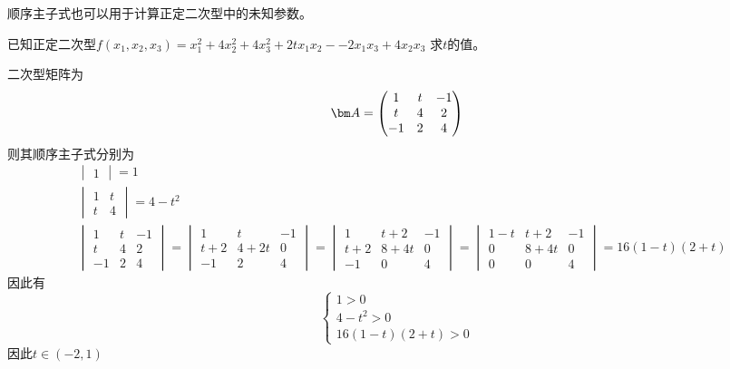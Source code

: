 顺序主子式也可以用于计算正定二次型中的未知参数。
\begin{example}
    已知正定二次型$f(x_1,x_2,x_3)=x_1^2 + 4x_2^2 + 4x_3^2 + 2tx_1x_2 - -2x_1x_3 + 4x_2x_3$
    求$t$的值。
\end{example}
\begin{solution}
    二次型矩阵为
    \[
        \mat{A} =
        \begin{pmatrix}
            1  & t & -1 \\
            t  & 4 & 2  \\
            -1 & 2 & 4
        \end{pmatrix}
    \]
    则其顺序主子式分别为
    \begin{align*}
         &
        \begin{vmatrix}
            1
        \end{vmatrix}  = 1    \\
         &
        \begin{vmatrix}
            1 & t \\
            t & 4
        \end{vmatrix} = 4-t^2 \\
         &
        \begin{vmatrix}
            1  & t & -1 \\
            t  & 4 & 2  \\
            -1 & 2 & 4
        \end{vmatrix} =
        \begin{vmatrix}
            1   & t    & -1 \\
            t+2 & 4+2t & 0  \\
            -1  & 2    & 4
        \end{vmatrix}
        =
        \begin{vmatrix}
            1   & t+2  & -1 \\
            t+2 & 8+4t & 0  \\
            -1  & 0    & 4
        \end{vmatrix}
        =
        \begin{vmatrix}
            1-t & t+2  & -1 \\
            0   & 8+4t & 0  \\
            0   & 0    & 4
        \end{vmatrix}
        = 16(1-t)(2+t)
    \end{align*}
    因此有
    \[
        \begin{cases}
            1>0     \\
            4-t^2>0 \\
            16(1-t)(2+t) > 0
        \end{cases}
    \]
    因此$t\in(-2,1)$
\end{solution}

